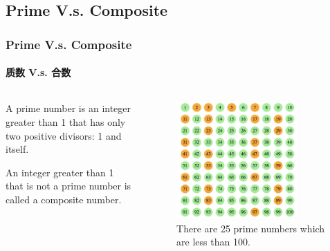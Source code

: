 \documentclass[
	11pt, %
]{beamer}
\begin{document}
\subsection{Prime V.s. Composite}
\begin{frame}
	\frametitle{Prime V.s. Composite}
	\framesubtitle{质数 V.s. 合数}
	\begin{columns}[t]
	\begin{column}{0.45\textwidth}
	\begin{definition}
		  A \alert{prime number} is an integer \alert{greater than 1} that has only two positive divisors: 1 and itself.
	  \end{definition}

	  \begin{definition}
		  An integer \alert{greater than 1} that is \alert{not} a prime number is called a \alert{composite} number.
	  \end{definition}
	\end{column}
	\begin{column}{0.5\textwidth}
	  	\begin{figure}
		\includegraphics[width=0.8\textwidth]{Prime_Numbers.png}
		\caption{There are 25 prime numbers which are less than 100.}
	\end{figure}
	\end{column}
	\end{columns}


\end{frame}

\end{document}
